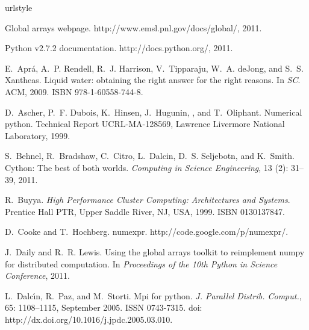\documentclass{sigplanconf}
\begin{document}
\begin{thebibliography}{35}
\providecommand{\natexlab}[1]{#1}
\providecommand{\url}[1]{\texttt{#1}}
\expandafter\ifx\csname urlstyle\endcsname\relax
  \providecommand{\doi}[1]{doi: #1}\else
  \providecommand{\doi}{doi: \begingroup \urlstyle{rm}\Url}\fi

Global arrays webpage.
\newblock http://www.emsl.pnl.gov/docs/global/, 2011.

Python v2.7.2 documentation.
\newblock http://docs.python.org/, 2011.

E.~Apr\'{a}, A.~P. Rendell, R.~J. Harrison, V.~Tipparaju, W.~A. deJong, and
  S.~S. Xantheas.
\newblock Liquid water: obtaining the right answer for the right reasons.
\newblock In \emph{SC}. ACM, 2009.
\newblock ISBN 978-1-60558-744-8.

D.~Ascher, P.~F. Dubois, K.~Hinsen, J.~Hugunin, , and T.~Oliphant.
\newblock Numerical python.
\newblock Technical Report UCRL-MA-128569, Lawrence Livermore National
  Laboratory, 1999.

S.~Behnel, R.~Bradshaw, C.~Citro, L.~Dalcin, D.~S. Seljebotn, and K.~Smith.
\newblock Cython: The best of both worlds.
\newblock \emph{Computing in Science Engineering}, 13 (2):
  31--39, 2011.

R.~Buyya.
\newblock \emph{High Performance Cluster Computing: Architectures and Systems}.
\newblock Prentice Hall PTR, Upper Saddle River, NJ, USA, 1999.
\newblock ISBN 0130137847.

D.~Cooke and T.~Hochberg.
\newblock numexpr.
\newblock http://code.google.com/p/numexpr/.

J.~Daily and R.~R. Lewis.
\newblock Using the global arrays toolkit to reimplement numpy for distributed
  computation.
\newblock In \emph{Proceedings of the 10th Python in Science Conference}, 2011.

L.~Dalc\'{\i}n, R.~Paz, and M.~Storti.
\newblock Mpi for python.
\newblock \emph{J. Parallel Distrib. Comput.}, 65: 1108--1115,
  September 2005.
\newblock ISSN 0743-7315.
\newblock \doi{http://dx.doi.org/10.1016/j.jpdc.2005.03.010}.


\end{thebibliography}
\end{document}

